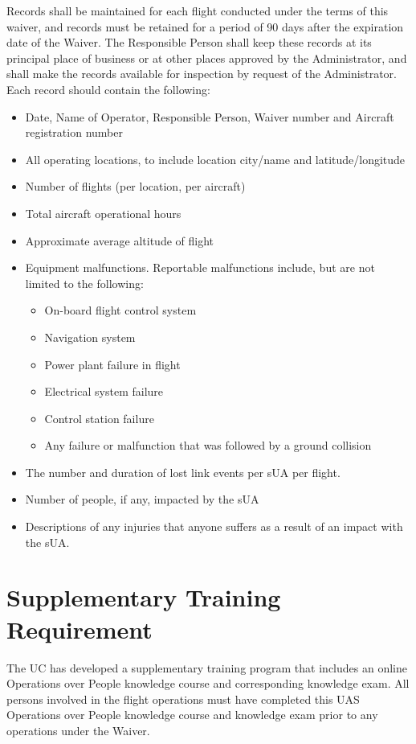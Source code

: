 \documentclass[
]{book}
\providecommand{\tightlist}{%
  \setlength{\itemsep}{0pt}\setlength{\parskip}{0pt}}
\begin{document}
Records shall be maintained for each flight conducted under the terms of this waiver, and records must be retained for a period of 90 days after the expiration date of the Waiver. The Responsible Person shall keep these records at its principal place of business or at other places approved by the Administrator, and shall make the records available for inspection by request of the Administrator. Each record should contain the following:

\begin{itemize}
\item
  Date, Name of Operator, Responsible Person, Waiver number and Aircraft registration number
\item
  All operating locations, to include location city/name and latitude/longitude
\item
  Number of flights (per location, per aircraft)
\item
  Total aircraft operational hours
\item
  Approximate average altitude of flight
\item
  Equipment malfunctions. Reportable malfunctions include, but are not limited to the following:

  \begin{itemize}
  \tightlist
  \item
    On-board flight control system
  \item
    Navigation system
  \item
    Power plant failure in flight
  \item
    Electrical system failure
  \item
    Control station failure
  \item
    Any failure or malfunction that was followed by a ground collision
  \end{itemize}
\item
  The number and duration of lost link events per sUA per flight.
\item
  Number of people, if any, impacted by the sUA
\item
  Descriptions of any injuries that anyone suffers as a result of an impact with the sUA.
\end{itemize}

\section{Supplementary Training Requirement}\label{s39p-tr}

The UC has developed a supplementary training program that includes an online Operations over People knowledge course and corresponding knowledge exam. All persons involved in the flight operations must have completed this UAS Operations over People knowledge course and knowledge exam prior to any operations under the Waiver.
\end{document}
